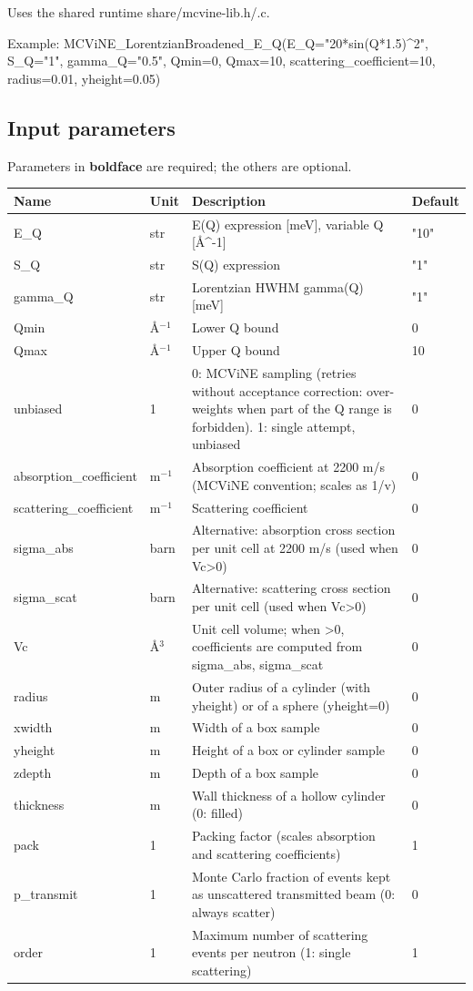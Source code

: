 Uses the shared runtime share/mcvine-lib.h/.c.

Example: MCViNE\_LorentzianBroadened\_E\_Q(E\_Q="20*sin(Q*1.5)\textasciicircum{}2", S\_Q="1", gamma\_Q="0.5", Qmin=0, Qmax=10, scattering\_coefficient=10, radius=0.01, yheight=0.05)

\subsection*{Input parameters}
Parameters in \textbf{boldface} are required; the others are optional.

\begin{longtable}{p{}p{}p{}p{}}
\toprule
\textbf{Name} & \textbf{Unit} & \textbf{Description} & \textbf{Default} \\
\midrule
\endhead
E\_Q & str & E(Q) expression [meV], variable Q [\AA{}\textasciicircum{}-1] & "10" \\
S\_Q & str & S(Q) expression & "1" \\
gamma\_Q & str & Lorentzian HWHM gamma(Q) [meV] & "1" \\
Qmin & \AA{}$^{-1}$ & Lower Q bound & 0 \\
Qmax & \AA{}$^{-1}$ & Upper Q bound & 10 \\
unbiased & 1 & 0: MCViNE sampling (retries without acceptance correction: over-weights when part of the Q range is forbidden). 1: single attempt, unbiased & 0 \\
absorption\_coefficient & m$^{-1}$ & Absorption coefficient at 2200 m/s (MCViNE convention; scales as 1/v) & 0 \\
scattering\_coefficient & m$^{-1}$ & Scattering coefficient & 0 \\
sigma\_abs & barn & Alternative: absorption cross section per unit cell at 2200 m/s (used when Vc\textgreater{}0) & 0 \\
sigma\_scat & barn & Alternative: scattering cross section per unit cell (used when Vc\textgreater{}0) & 0 \\
Vc & \AA{}$^{3}$ & Unit cell volume; when \textgreater{}0, coefficients are computed from sigma\_abs, sigma\_scat & 0 \\
radius & m & Outer radius of a cylinder (with yheight) or of a sphere (yheight=0) & 0 \\
xwidth & m & Width of a box sample & 0 \\
yheight & m & Height of a box or cylinder sample & 0 \\
zdepth & m & Depth of a box sample & 0 \\
thickness & m & Wall thickness of a hollow cylinder (0: filled) & 0 \\
pack & 1 & Packing factor (scales absorption and scattering coefficients) & 1 \\
p\_transmit & 1 & Monte Carlo fraction of events kept as unscattered transmitted beam (0: always scatter) & 0 \\
order & 1 & Maximum number of scattering events per neutron (1: single scattering) & 1 \\
\bottomrule
\end{longtable}

